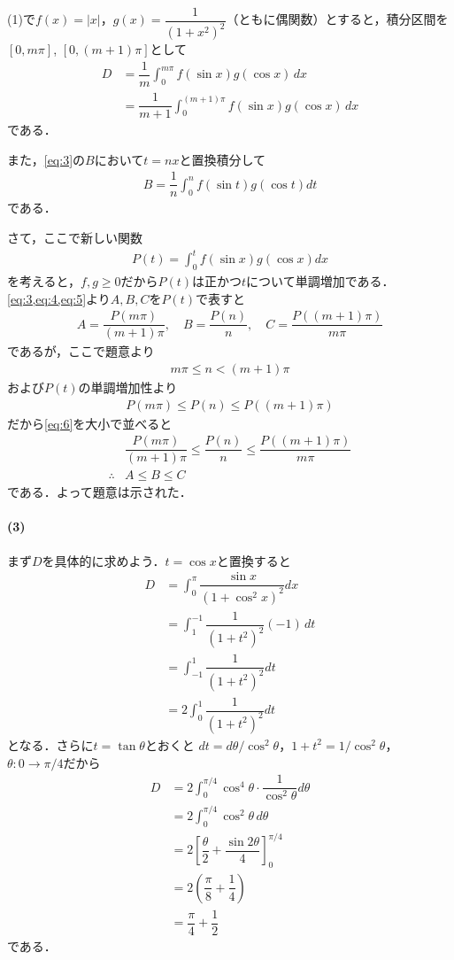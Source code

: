 \documentclass[../../main.tex]{subfiles}
\begin{document}
(1)で$f(x)=|x|$，$g(x)=\dfrac{1}{(1+x^2)^2}$（ともに偶関数）とすると，積分区間を$[0,m\pi]$, $[0,(m+1)\pi]$として
\begin{align}
  D
  &= \dfrac{1}{m}\int_0^{m\pi}f(\sin x)g(\cos x)\,dx \\
  &= \dfrac{1}{m+1}\int_0^{(m+1)\pi}f(\sin x)g(\cos x)\,dx  \label{eq:4}
\end{align}
である．

また，\cref{eq:3}の$B$において$t=nx$と置換積分して
\begin{align}
  B=\dfrac{1}{n}\int_0^nf(\sin t)g(\cos t)dt \label{eq:5}
\end{align}
である．

さて，ここで新しい関数
\begin{align}
  P(t) = \int_0^tf(\sin x)g(\cos x)dx
\end{align}
を考えると，$f,g\ge0$だから$P(t)$は正かつ$t$について単調増加である．
\cref{eq:3,eq:4,eq:5}より$A,B,C$を$P(t)$で表すと
\begin{align}
  A = \dfrac{P(m\pi)}{(m+1)\pi}, \quad B = \dfrac{P(n)}{n}, \quad C = \dfrac{P((m+1)\pi)}{m\pi} \label{eq:6}
\end{align}
であるが，ここで題意より
\begin{align}
  m\pi \le n < (m+1)\pi
\end{align}
および$P(t)$の単調増加性より
\begin{align}
  P(m\pi) \le P(n) \le P((m+1)\pi)
\end{align}
だから\cref{eq:6}を大小で並べると
\begin{align}
  &\dfrac{P(m\pi)}{(m+1)\pi} \le \dfrac{P(n)}{n} \le \dfrac{P((m+1)\pi)}{m\pi} \\
  \therefore
  & A \le B \le C
\end{align}
である．よって題意は示された．

\paragraph{(3)}

まず$D$を具体的に求めよう．$t = \cos x$と置換すると
\begin{align}
  D
  &= \int_0^\pi\dfrac{\sin x}{(1+\cos^2x)^2}dx \\
  &= \int_1^{-1}\dfrac{1}{(1+t^2)^2}(-1)\,dt \\
  &=\int_{-1}^1\dfrac{1}{(1+t^2)^2}dt \\
  &=2\int_0^1\dfrac{1}{(1+t^2)^2}dt
\end{align}
となる．さらに$t=\tan\theta$とおくと
$dt=d\theta/\cos^2\theta$，$1+t^2=1/\cos^2\theta$，$\theta:0\to\pi/4$だから
\begin{align}
  D
  &=2\int_0^{\pi/4}\cos^4\theta\cdot\dfrac{1}{\cos^2\theta}d\theta \\
  &=2\int_0^{\pi/4}\cos^2\theta\,d\theta \\
  &=2\left[\dfrac{\theta}{2}+\dfrac{\sin2\theta}{4}\right]_0^{\pi/4} \\
  &=2\left(\dfrac{\pi}{8}+\dfrac{1}{4}\right) \\
  &=\dfrac{\pi}{4}+\dfrac{1}{2} \label{eq:7}
\end{align}
である．
\end{document}
